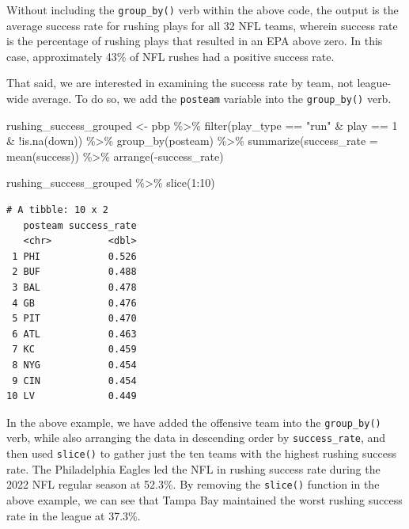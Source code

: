 \documentclass[
  letterpaper,
]{krantz}
\newenvironment{Shaded}{\begin{snugshade}}{\end{snugshade}}
\newcommand{\AttributeTok}[1]{\textcolor[rgb]{0.40,0.45,0.13}{#1}}
\newcommand{\DecValTok}[1]{\textcolor[rgb]{0.68,0.00,0.00}{#1}}
\newcommand{\FunctionTok}[1]{\textcolor[rgb]{0.28,0.35,0.67}{#1}}
\newcommand{\NormalTok}[1]{\textcolor[rgb]{0.00,0.23,0.31}{#1}}
\newcommand{\OtherTok}[1]{\textcolor[rgb]{0.00,0.23,0.31}{#1}}
\newcommand{\SpecialCharTok}[1]{\textcolor[rgb]{0.37,0.37,0.37}{#1}}
\newcommand{\StringTok}[1]{\textcolor[rgb]{0.13,0.47,0.30}{#1}}
\begin{document}
Without including the \texttt{group\_by()} verb within the above code,
the output is the average success rate for rushing plays for all 32 NFL
teams, wherein success rate is the percentage of rushing plays that
resulted in an EPA above zero. In this case, approximately 43\% of NFL
rushes had a positive success rate.

That said, we are interested in examining the success rate by team, not
league-wide average. To do so, we add the \texttt{posteam} variable into
the \texttt{group\_by()} verb.

\begin{Shaded}
\begin{Highlighting}[]
\NormalTok{rushing\_success\_grouped }\OtherTok{\textless{}{-}}\NormalTok{ pbp }\SpecialCharTok{\%\textgreater{}\%}
  \FunctionTok{filter}\NormalTok{(play\_type }\SpecialCharTok{==} \StringTok{"run"} \SpecialCharTok{\&}\NormalTok{ play }\SpecialCharTok{==} \DecValTok{1} \SpecialCharTok{\&} \SpecialCharTok{!}\FunctionTok{is.na}\NormalTok{(down)) }\SpecialCharTok{\%\textgreater{}\%}
  \FunctionTok{group\_by}\NormalTok{(posteam) }\SpecialCharTok{\%\textgreater{}\%}
  \FunctionTok{summarize}\NormalTok{(}\AttributeTok{success\_rate =} \FunctionTok{mean}\NormalTok{(success)) }\SpecialCharTok{\%\textgreater{}\%}
  \FunctionTok{arrange}\NormalTok{(}\SpecialCharTok{{-}}\NormalTok{success\_rate)}

\NormalTok{rushing\_success\_grouped }\SpecialCharTok{\%\textgreater{}\%}
  \FunctionTok{slice}\NormalTok{(}\DecValTok{1}\SpecialCharTok{:}\DecValTok{10}\NormalTok{)}
\end{Highlighting}
\end{Shaded}

\begin{verbatim}
# A tibble: 10 x 2
   posteam success_rate
   <chr>          <dbl>
 1 PHI            0.526
 2 BUF            0.488
 3 BAL            0.478
 4 GB             0.476
 5 PIT            0.470
 6 ATL            0.463
 7 KC             0.459
 8 NYG            0.454
 9 CIN            0.454
10 LV             0.449
\end{verbatim}

In the above example, we have added the offensive team into the
\texttt{group\_by()} verb, while also arranging the data in descending
order by \texttt{success\_rate}, and then used \texttt{slice()} to
gather just the ten teams with the highest rushing success rate. The
Philadelphia Eagles led the NFL in rushing success rate during the 2022
NFL regular season at 52.3\%. By removing the \texttt{slice()} function
in the above example, we can see that Tampa Bay maintained the worst
rushing success rate in the league at 37.3\%.
\end{document}
